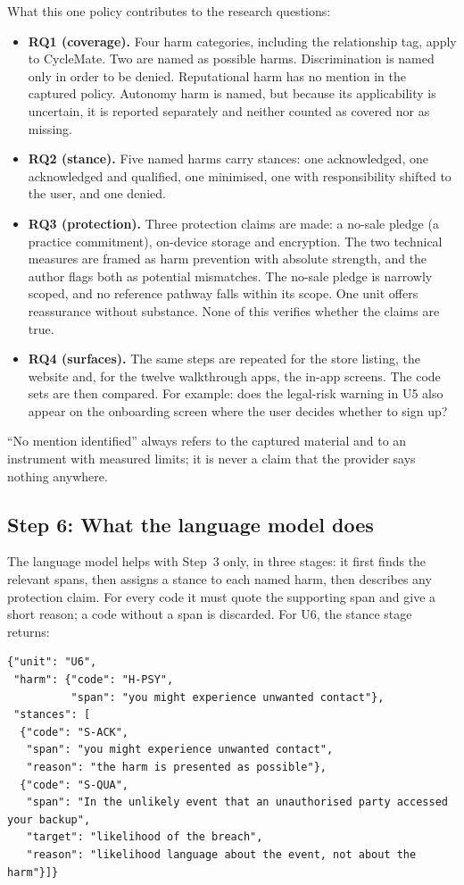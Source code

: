 \noindent What this one policy contributes to the research questions:
\begin{itemize}
  \item \textbf{RQ1 (coverage).} Four harm categories, including the
    relationship tag, apply to CycleMate. Two are named as possible harms.
    Discrimination is named only in order to be denied. Reputational harm has
    no mention in the captured policy. Autonomy harm is named, but because its
    applicability is uncertain, it is reported separately and neither counted
    as covered nor as missing.
  \item \textbf{RQ2 (stance).} Five named harms carry stances: one
    acknowledged, one acknowledged and qualified, one minimised, one with
    responsibility shifted to the user, and one denied.
  \item \textbf{RQ3 (protection).} Three protection claims are made: a
    no-sale pledge (a practice commitment), on-device storage and encryption.
    The two technical measures are framed as harm prevention with absolute
    strength, and the author flags both as potential mismatches. The no-sale
    pledge is narrowly scoped, and no reference pathway falls within its
    scope. One unit offers reassurance without substance. None of this
    verifies whether the claims are true.
  \item \textbf{RQ4 (surfaces).} The same steps are repeated for the store
    listing, the website and, for the twelve walkthrough apps, the in-app
    screens. The code sets are then compared. For example: does the legal-risk
    warning in U5 also appear on the onboarding screen where the user decides
    whether to sign up?
\end{itemize}
\enquote{No mention identified} always refers to the captured material and to
an instrument with measured limits; it is never a claim that the provider
says nothing anywhere.

\subsection*{Step 6: What the language model does}

The language model helps with Step~3 only, in three stages: it first finds
the relevant spans, then assigns a stance to each named harm, then describes
any protection claim. For every code it must quote the supporting span and
give a short reason; a code without a span is discarded. For U6, the stance
stage returns:

\begin{lstlisting}[style=jsoncode]
{"unit": "U6",
 "harm": {"code": "H-PSY",
          "span": "you might experience unwanted contact"},
 "stances": [
  {"code": "S-ACK",
   "span": "you might experience unwanted contact",
   "reason": "the harm is presented as possible"},
  {"code": "S-QUA",
   "span": "In the unlikely event that an unauthorised party accessed your backup",
   "target": "likelihood of the breach",
   "reason": "likelihood language about the event, not about the harm"}]}
\end{lstlisting}

